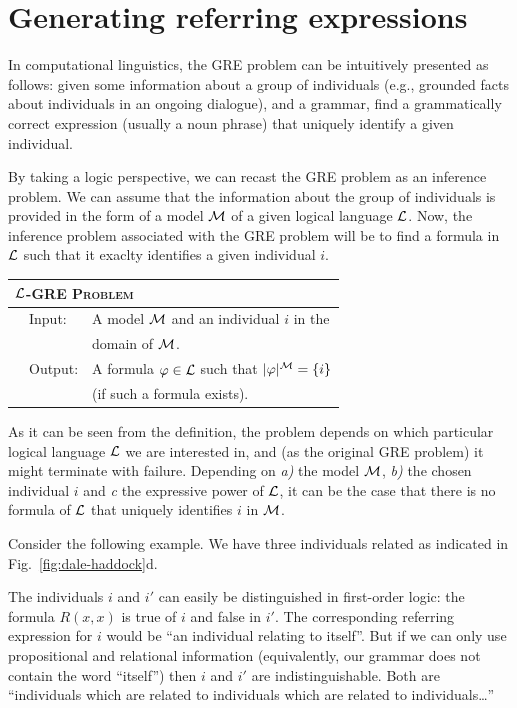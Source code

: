 \section{Generating referring expressions} \label{sec:gre}

In computational linguistics, the GRE
problem can be intuitively presented as follows: given some information about
a group of individuals (e.g., grounded facts about individuals in an ongoing dialogue),
and a grammar, find a grammatically correct expression (usually a noun phrase) that uniquely identify a given individual.

By taking a logic perspective, we can recast the GRE problem as an inference problem.
We can assume that the information about the group of individuals is provided in the form
of a model $\mathcal{M}$ of a given logical language $\mathcal{L}$.  Now, the inference problem
associated with the GRE problem will be to find a formula in $\mathcal{L}$ such that it
exaclty identifies a given individual $i$.
\medskip

\noindent
{\small
\begin{center}
\begin{tabular}{ll} \hline
\multicolumn{2}{l}{
\textsc{$\mathcal{L}$-GRE Problem}}\\ \hline
\ \ Input: & A model $\mathcal{M}$ and an individual $i$ in the\\
& \hspace*{0.5cm} domain of $\mathcal{M}$.\\
\ \ Output: & A formula $\varphi \in \mathcal{L}$ such that $|\varphi|^{\mathcal{M}} = \{i\}$\\
& \hspace*{0.5cm} (if such a formula exists).\\ \hline
\end{tabular}
\end{center}}
\medskip

As it can be seen from the definition, the problem depends on which particular
logical language $\mathcal{L}$ we are interested in, and (as the original GRE problem)
it might terminate with failure.  Depending on \emph{a)} the model $\mathcal{M}$,
\emph{b)} the chosen individual $i$
and \emph{c} the expressive power of $\mathcal{L}$, it can be the case that there is no formula of
$\mathcal{L}$ that uniquely identifies $i$ in $\mathcal{M}$.

Consider the following example.  We have three individuals related as indicated in
Fig.~\ref{fig:dale-haddock}d.

%
The individuals $i$ and $i'$ can easily be distinguished in first-order logic:
the formula $R(x,x)$ is true of $i$ and false in $i'$. The corresponding
referring expression for $i$ would be ``an individual relating to itself''.
But if we can only use propositional and relational information (equivalently, our grammar does not contain the word ``itself'') then $i$ and $i'$ are indistinguishable. Both
are ``individuals which are related to individuals which are related to individuals\ldots''

